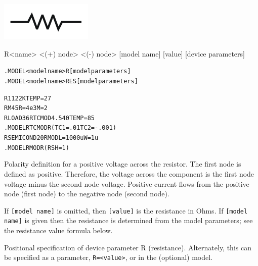 


\begin{Device}

\symbol
{\includegraphics{resistorSymbol}}

\device
R<name> <(+) node> <(-) node> [model name] [value] [device parameters]

\model
\begin{alltt}
.MODEL <model name> R [model parameters]
.MODEL <model name> RES [model parameters]
\end{alltt}

\examples
\begin{alltt}
R1 1 2 2K TEMP=27
RM 4 5 R=4e3 M=2
RLOAD 3 6 RTCMOD 4.540 TEMP=85
.MODEL RTCMOD R (TC1=.01 TC2=-.001)
RSEMICOND 2 0 RMOD L=1000u W=1u
.MODEL RMOD R (RSH=1)
\end{alltt}

\parameters

\begin{Parameters}


Polarity definition for a positive voltage across the resistor. The
first node is defined as positive. Therefore, the voltage across the
component is the first node voltage minus the second node voltage.
Positive current flows from the positive node (first node) to the
negative node (second node).


If \texttt{[model name]} is omitted, then \texttt{[value]} is the
resistance in Ohms. If \texttt{[model name]} is given then the
resistance is determined from the model parameters; see the resistance
value formula below.


Positional specification of device parameter R (resistance).
Alternately, this can be specified as a parameter, \texttt{R=<value>},
or in the (optional) model.


\end{Parameters}
\end{Device}
